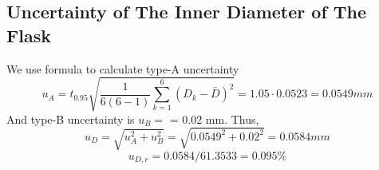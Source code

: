 \subsection{Uncertainty of The Inner Diameter of The Flask}
We use formula to calculate type-A uncertainty
\begin{equation}
  u_A = t_{0.95} \sqrt{\frac{1}{6(6-1)} \sum_{k=1}^{6}{(D_k-\bar{D})^2} }
 = 1.05  \cdot 0.0523 =  0.0549 mm 
\end{equation}
And type-B uncertainty is $u_B = $ = 0.02 mm. Thus,
$$   u_D = \sqrt{u_A^2+u_B^2} = \sqrt{0.0549^2+0.02^2} = 0.0584 mm $$
$$   u_{D,r} = 0.0584 /  61.3533 =  0.095 \% $$ 


